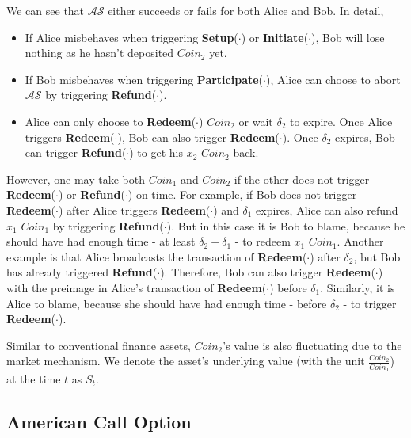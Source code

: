 We can see that $\mathcal{AS}$ either succeeds or fails for both Alice and Bob.
In detail,

\begin{itemize}
    \item If Alice misbehaves when triggering \textbf{Setup}($\cdot$) or \textbf{Initiate}($\cdot$), Bob will lose nothing as he hasn't deposited $Coin_2$ yet.
    \item If Bob misbehaves when triggering \textbf{Participate}($\cdot$), Alice can choose to abort $\mathcal{AS}$ by triggering \textbf{Refund}($\cdot$).
    \item Alice can only choose to \textbf{Redeem}($\cdot$) $Coin_2$ or wait $\delta_2$ to expire.
    Once Alice triggers \textbf{Redeem}($\cdot$), Bob can also trigger \textbf{Redeem}($\cdot$).
    Once $\delta_2$ expires, Bob can trigger \textbf{Refund}($\cdot$) to get his $x_2$ $Coin_2$ back.
\end{itemize}

However, one may take both $Coin_1$ and $Coin_2$ if the other does not trigger \textbf{Redeem}($\cdot$) or \textbf{Refund}($\cdot$) on time.
For example, if Bob does not trigger \textbf{Redeem}($\cdot$) after Alice triggers \textbf{Redeem}($\cdot$) and $\delta_1$ expires, Alice can also refund $x_1$ $Coin_1$ by triggering \textbf{Refund}($\cdot$).
But in this case it is Bob to blame, because he should have had enough time - at least $\delta_2 - \delta_1$  - to redeem $x_1$ $Coin_1$.
Another example is that Alice broadcasts the transaction of \textbf{Redeem}($\cdot$) after $\delta_2$, but Bob has already triggered \textbf{Refund}($\cdot$).
Therefore, Bob can also trigger \textbf{Redeem}($\cdot$) with the preimage in Alice's transaction of \textbf{Redeem}($\cdot$) before $\delta_1$.
Similarly, it is Alice to blame, because she should have had enough time - before $\delta_2$ - to trigger \textbf{Redeem}($\cdot$).

Similar to conventional finance assets, $Coin_2$'s value is also fluctuating due to the market mechanism.
We denote the asset's underlying value (with the unit $\frac{Coin_2}{Coin_1}$) at the time $t$ as $S_t$.















\subsection{American Call Option}

